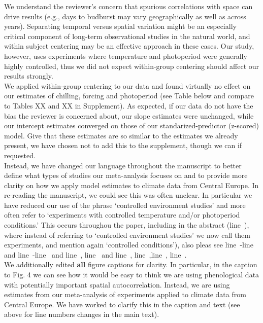 \documentclass[11pt, a4paper]{article}
\newcommand{\lr}[1]{line~\lineref{#1}}
\begin{document}
We understand the reviewer's concern that spurious correlations with space can drive results (e.g., days to budburst may vary geographically as well as across years). Separating temporal versus spatial variation might be an especially critical component of long-term observational studies in the natural world, and within subject centering may be an effective approach in these cases. Our study, however, uses experiments where temperature and photoperiod were generally highly controlled, thus we did not expect within-group centering should affect our results strongly. \\

We applied within-group centering to our data and found virtually no effect on our estimates of chilling, forcing and photoperiod (see Table below and compare to Tables XX and XX in Supplement). As expected, if our data do not have the bias the reviewer is concerned about, our slope estimates were unchanged, while our intercept estimates converged on those of our standarized-predictor (z-scored) model. Give that these estimates are so similar to the estimates we already present, we have chosen not to add this to the supplement, though we can if requested.\\

Instead, we have changed our language throughout the manuscript to better define what types of studies our meta-analysis focuses on and to provide more clarity on how we apply model estimates to climate data from Central Europe. In re-reading the manuscript, we could see this was often unclear. In particular we have reduced our use of the phrase `controlled environment studies' and more often refer to `experiments with controlled temperature and/or photoperiod conditions.' This occurs throughou the paper, including in the abstract (\lr{ee1}), where instead of referring to `controlled environment studies' we now call them experiments, and mention again `controlled conditions'), also pleas see \lr{ee2start}-\lr{ee2end} and \lr{ee3start}-\lr{ee3end} and \lr{ee4}, \lr{ee5} and \lr{ee6}, \lr{ee7},\lr{ee8}, \lr{ee9}.\\

We additionally edited {\bf all} figure captions for clarity. In particular, in the caption to Fig. 4 we can see how it would be easy to think we are using phenological data with potentially important spatial autocorrelation. Instead, we are using estimates from our meta-analysis of experiments applied to climate data from Central Europe. We have worked to clarify this in the caption and text (see above for line numbers changes in the main text). \\%
\end{document}
